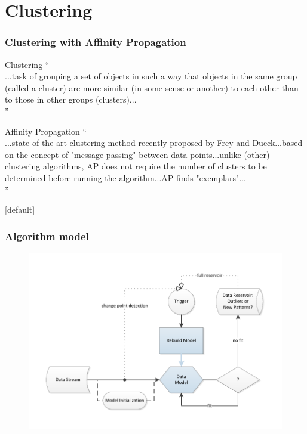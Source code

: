 \documentclass{beamer}
\begin{document}
  \section{Clustering}
  \begin{frame}
    \frametitle{Clustering with \textbf{Affinity Propagation}} 
    \begin{block}{Clustering}
    ``\\...task of grouping a set of objects in such a way that objects in the same group (called a cluster) are more similar (in some sense or another) to each other than to those in other groups (clusters)...\\''
    \end{block}
    \pause
    \begin{block}{Affinity Propagation}
    ``\\...state-of-the-art clustering method recently proposed by Frey and Dueck...based on the concept of "message passing" between data points...unlike (other) clustering algorithms, AP does not require the number of clusters to be determined before running the algorithm...AP finds "exemplars"...\\''
    \end{block}
  \end{frame}

  {
  \makeatletter
    [default]
    \def\beamer@entrycode{\vspace*{-\headheight}}
  \makeatother
  \begin{frame}
    \frametitle{Algorithm model} 
    \begin{figure}[htbp]
      \includegraphics[width=\textwidth]{./gfx/APC.pdf}
    \end{figure}
  \end{frame}
  }
\end{document}
